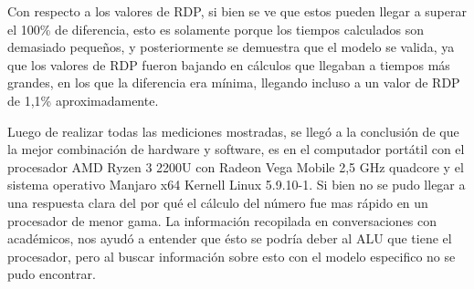 \documentclass[11pt, twocolumn]{llncs}
\begin{document}
Con respecto a los valores de RDP, si bien se ve que estos pueden llegar a superar el 100\% de diferencia, esto es solamente porque los tiempos calculados son demasiado pequeños, y posteriormente se demuestra que el modelo se valida, ya que los valores de RDP fueron bajando en cálculos que llegaban a tiempos más grandes, en los que la diferencia era mínima, llegando incluso a un valor de RDP de 1,1\% aproximadamente.

Luego de realizar todas las mediciones mostradas, se llegó a la conclusión de que la mejor combinación de hardware y software, es en el computador portátil con el procesador AMD Ryzen 3 2200U con Radeon Vega Mobile 2,5 GHz quadcore y el sistema operativo Manjaro x64 Kernell Linux 5.9.10-1. Si bien no se pudo llegar a una respuesta clara del por qué el cálculo del número fue mas rápido en un procesador de menor gama. La información recopilada en conversaciones con académicos, nos ayudó a entender que ésto se podría deber al ALU que tiene el procesador, pero al buscar información sobre esto con el modelo especifico no se pudo encontrar.

\end{document}
